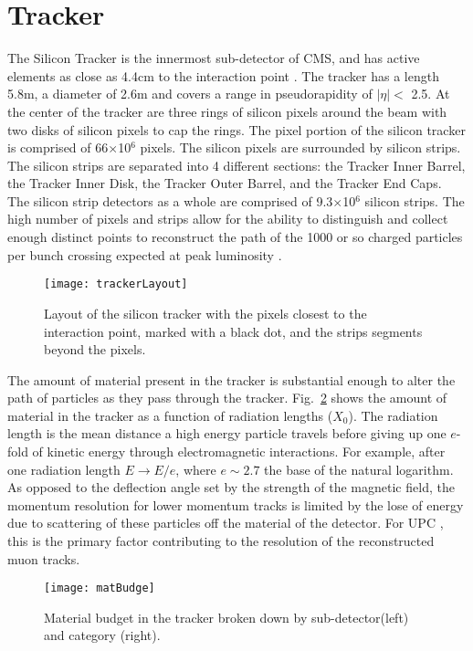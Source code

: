   \section{Tracker}
    The Silicon Tracker is the innermost sub-detector of CMS, and has active
    	elements as close as 4.4cm to the interaction point \cite{tCmsE}. 
    The tracker has a length 5.8m, a diameter of 2.6m and
    	covers a range in pseudorapidity of $|\eta| <$ 2.5.
    At the center of the tracker are three rings of silicon pixels around the beam 
    	with two disks of silicon pixels to cap the rings.
    The pixel portion of the silicon tracker is comprised of 66$\times$10$^{6}$
    	pixels.
    The silicon pixels are surrounded by silicon strips.
    The silicon strips are separated into 4 different sections: 
    	the Tracker Inner Barrel, the Tracker Inner Disk, the Tracker Outer 
    	Barrel, and the Tracker End Caps.
    The silicon strip detectors as a whole are comprised of 9.3$\times$10$^{6}$ silicon 
    	strips.
    The high number of pixels and strips allow for the ability to distinguish
    	and collect enough distinct points to reconstruct the path of the 1000
    	or so charged particles per bunch crossing expected at peak luminosity
    	\cite{tCmsE}.
    \begin{figure}[!Hhbt]
      \centering
      \texttt{[image: trackerLayout]}
      \caption{Layout of the silicon tracker with the pixels closest to the 
        interaction point, marked with a black dot, and the strips segments 
        beyond the pixels.}
      \label{fig:fig:trackerLayout}
    \end{figure}

    The amount of material present in the tracker is substantial enough to
      alter the path of particles as they pass through the tracker. 
    Fig.~\ref{fig:matBudge} shows the amount of material in the tracker 
      as a function of radiation lengths ($X_{0}$).
    The radiation length is the mean distance a high energy particle travels 
      before giving up one $e$-fold of kinetic energy through electromagnetic
    	interactions.
    For example, after one radiation length $E \rightarrow E/e$, where 
    	$e \sim 2.7$ the base of the natural logarithm. 
    As opposed to the deflection angle set by the strength of the magnetic 
      field, the momentum resolution for lower momentum tracks is limited by 
      the lose of energy due to scattering of these particles off the material 
      of the detector.
    For UPC \JPsi{}, this is the primary factor contributing to the resolution 
      of the reconstructed muon tracks. 
    \begin{figure}[!Hhbt]
      \centering
      \texttt{[image: matBudge]}
      \caption{Material budget in the tracker broken down by sub-detector(left) and
        category (right).}
      \label{fig:matBudge}
    \end{figure}

